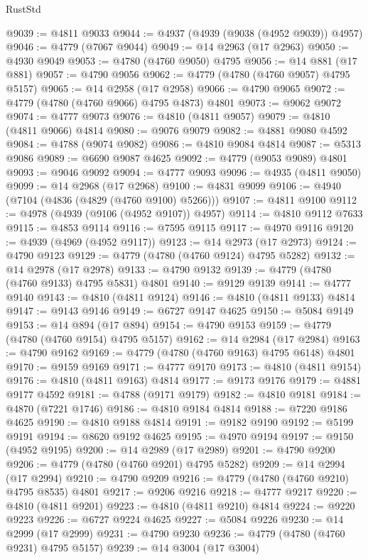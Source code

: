 \begin{lexlean}{RustStd}
\begin{coremodule}
@9039 := @4811 @9033
@9044 := @4937 (@4939 (@9038 (@4952 @9039)) @4957)
@9046 := @4779 (@7067 @9044)
@9049 := @14 @2963 (@17 @2963)
@9050 := @4930 @9049
@9053 := @4780 (@4760 @9050) @4795
@9056 := @14 @881 (@17 @881)
@9057 := @4790 @9056
@9062 := @4779 (@4780 (@4760 @9057) @4795 @5157)
@9065 := @14 @2958 (@17 @2958)
@9066 := @4790 @9065
@9072 := @4779 (@4780 (@4760 @9066) @4795 @4873) @4801
@9073 := @9062 @9072
@9074 := @4777 @9073
@9076 := @4810 (@4811 @9057)
@9079 := @4810 (@4811 @9066) @4814
@9080 := @9076 @9079
@9082 := @4881 @9080 @4592
@9084 := @4788 (@9074 @9082)
@9086 := @4810 @9084 @4814
@9087 := @5313 @9086
@9089 := @6690 @9087 @4625
@9092 := @4779 (@9053 @9089) @4801
@9093 := @9046 @9092
@9094 := @4777 @9093
@9096 := @4935 (@4811 @9050)
@9099 := @14 @2968 (@17 @2968)
@9100 := @4831 @9099
@9106 := @4940 (@7104 (@4836 (@4829 (@4760 @9100) @5266)))
@9107 := @4811 @9100
@9112 := @4978 (@4939 (@9106 (@4952 @9107)) @4957)
@9114 := @4810 @9112 @7633
@9115 := @4853 @9114
@9116 := @7595 @9115
@9117 := @4970 @9116
@9120 := @4939 (@4969 (@4952 @9117))
@9123 := @14 @2973 (@17 @2973)
@9124 := @4790 @9123
@9129 := @4779 (@4780 (@4760 @9124) @4795 @5282)
@9132 := @14 @2978 (@17 @2978)
@9133 := @4790 @9132
@9139 := @4779 (@4780 (@4760 @9133) @4795 @5831) @4801
@9140 := @9129 @9139
@9141 := @4777 @9140
@9143 := @4810 (@4811 @9124)
@9146 := @4810 (@4811 @9133) @4814
@9147 := @9143 @9146
@9149 := @6727 @9147 @4625
@9150 := @5084 @9149
@9153 := @14 @894 (@17 @894)
@9154 := @4790 @9153
@9159 := @4779 (@4780 (@4760 @9154) @4795 @5157)
@9162 := @14 @2984 (@17 @2984)
@9163 := @4790 @9162
@9169 := @4779 (@4780 (@4760 @9163) @4795 @6148) @4801
@9170 := @9159 @9169
@9171 := @4777 @9170
@9173 := @4810 (@4811 @9154)
@9176 := @4810 (@4811 @9163) @4814
@9177 := @9173 @9176
@9179 := @4881 @9177 @4592
@9181 := @4788 (@9171 @9179)
@9182 := @4810 @9181
@9184 := @4870 (@7221 @1746)
@9186 := @4810 @9184 @4814
@9188 := @7220 @9186 @4625
@9190 := @4810 @9188 @4814
@9191 := @9182 @9190
@9192 := @5199 @9191
@9194 := @8620 @9192 @4625
@9195 := @4970 @9194
@9197 := @9150 (@4952 @9195)
@9200 := @14 @2989 (@17 @2989)
@9201 := @4790 @9200
@9206 := @4779 (@4780 (@4760 @9201) @4795 @5282)
@9209 := @14 @2994 (@17 @2994)
@9210 := @4790 @9209
@9216 := @4779 (@4780 (@4760 @9210) @4795 @8535) @4801
@9217 := @9206 @9216
@9218 := @4777 @9217
@9220 := @4810 (@4811 @9201)
@9223 := @4810 (@4811 @9210) @4814
@9224 := @9220 @9223
@9226 := @6727 @9224 @4625
@9227 := @5084 @9226
@9230 := @14 @2999 (@17 @2999)
@9231 := @4790 @9230
@9236 := @4779 (@4780 (@4760 @9231) @4795 @5157)
@9239 := @14 @3004 (@17 @3004)

\end{coremodule}
\end{lexlean}
